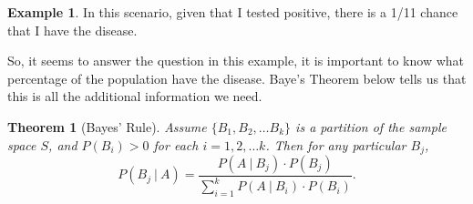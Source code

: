 \documentclass[
]{book}
\newtheorem{theorem}{Theorem}[chapter]
\theoremstyle{definition}
\theoremstyle{definition}
\newtheorem{example}{Example}[chapter]
\theoremstyle{definition}
\theoremstyle{definition}
\theoremstyle{remark}
\begin{document}
\begin{example}
In this scenario, given that I tested positive, there is a 1/11 chance that I have the disease.

So, it seems to answer the question in this example, it is important to know what percentage of the population have the disease. Baye's Theorem below tells us that this is all the additional information we need.
\end{example}

\begin{theorem}[Bayes' Rule]
\protect\hypertarget{thm:Bayes-rule}{}\label{thm:Bayes-rule}Assume \(\{B_1, B_2, \ldots B_k\}\) is a partition of the sample space \(S\), and \(P(B_i) > 0\) for each \(i = 1, 2, \ldots k\). Then for any particular \(B_j\), \[P(B_j ~|~ A) = \frac{P(A~|~B_j)\cdot P(B_j)}{\sum_{i=1}^k P(A~|~B_i)\cdot P(B_i)}.\]
\end{theorem}
\end{document}
